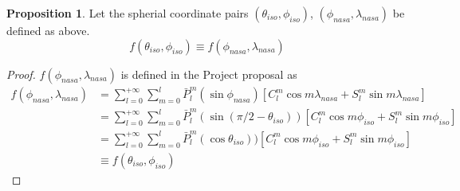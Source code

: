 \documentclass[a4paper]{article}
\theoremstyle{definition}
\newtheorem{proposition}{Proposition}
\begin{document}
\begin{proposition} Let the spherial coordinate pairs $(\theta_{iso}, \phi_{iso})$, $(\phi_{nasa}, \lambda_{nasa})$ be defined as above. 
    \begin{equation*}
        f(\theta_{iso}, \phi_{iso}) \equiv f(\phi_{nasa}, \lambda_{nasa})
    \end{equation*}
    
\end{proposition}

\begin{proof}
    $f(\phi_{nasa}, \lambda_{nasa})$ is defined in the Project proposal as 
    \begin{align} \label{eq:project_def} 
        f(\phi_{nasa}, \lambda_{nasa}) &= \sum_{l = 0}^{+\infty}\sum_{m = 0}^l \bar P_l^m(\sin\phi_{nasa})[C_l^m\cos m\lambda_{nasa} + S_l^m \sin m \lambda_{nasa}] \\ 
                                       &= \sum_{l = 0}^{+\infty}\sum_{m = 0}^l \bar P_l^m(\sin(\pi/2 - \theta_{iso}))[C_l^m\cos m\phi_{iso} + S_l^m \sin m \phi_{iso}] \\
                                       &= \sum_{l = 0}^{+\infty}\sum_{m = 0}^l \bar P_l^m(\cos\theta_{iso}))[C_l^m\cos m\phi_{iso} + S_l^m \sin m \phi_{iso}] \\
                                       &\equiv f(\theta_{iso}, \phi_{iso})
    \end{align}

\end{proof}
\end{document}
